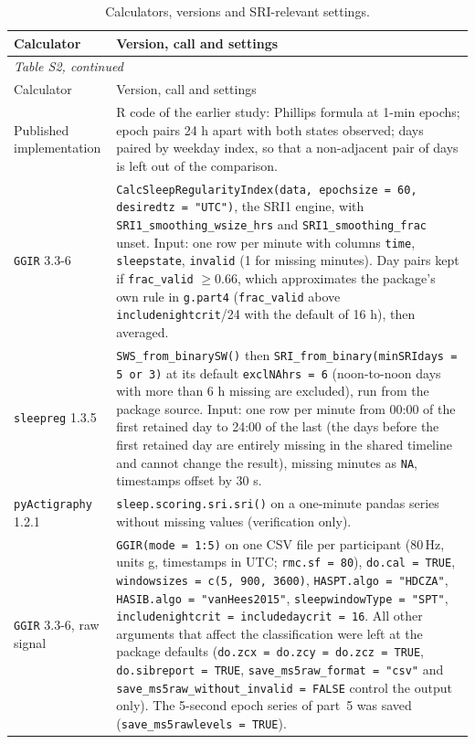 \documentclass[12pt]{article}
\begin{document}
{\small\setlength{\tabcolsep}{4pt}
\begin{longtable}{p{}>{\raggedright\arraybackslash}p{}}
\caption{Calculators, versions and SRI-relevant settings.}
\label{tab:S_versions}\\
\toprule
Calculator & Version, call and settings \\
\midrule
\endfirsthead
\multicolumn{2}{l}{\emph{Table S2, continued}}\\
\toprule
Calculator & Version, call and settings \\
\midrule
\endhead
\bottomrule
\endlastfoot
Published implementation & R code of the earlier study: Phillips formula at 1-min epochs; epoch pairs 24 h apart with both states observed; days paired by weekday index, so that a non-adjacent pair of days is left out of the comparison. \\
\texttt{GGIR} 3.3-6 & \texttt{CalcSleepRegularityIndex(data, epochsize = 60, desiredtz = "UTC")}, the SRI1 engine, with \texttt{SRI1\_smoothing\_wsize\_hrs} and \texttt{SRI1\_smoothing\_frac} unset. Input: one row per minute with columns \texttt{time}, \texttt{sleepstate}, \texttt{invalid} (1 for missing minutes). Day pairs kept if \texttt{frac\_valid} $\geq 0.66$, which approximates the package's own rule in \texttt{g.part4} (\texttt{frac\_valid} above \texttt{includenightcrit}/24 with the default of 16 h), then averaged. \\
\texttt{sleepreg} 1.3.5 & \texttt{SWS\_from\_binarySW()} then \texttt{SRI\_from\_binary(minSRIdays = 5 or 3)} at its default \texttt{exclNAhrs = 6} (noon-to-noon days with more than 6 h missing are excluded), run from the package source. Input: one row per minute from 00:00 of the first retained day to 24:00 of the last (the days before the first retained day are entirely missing in the shared timeline and cannot change the result), missing minutes as \texttt{NA}, timestamps offset by 30 s. \\
\texttt{pyActigraphy} 1.2.1 & \texttt{sleep.scoring.sri.sri()} on a one-minute pandas series without missing values (verification only). \\
\texttt{GGIR} 3.3-6, raw signal & \texttt{GGIR(mode = 1:5)} on one CSV file per participant (80\,Hz, units g, timestamps in UTC; \texttt{rmc.sf = 80}), \texttt{do.cal = TRUE}, \texttt{windowsizes = c(5, 900, 3600)}, \texttt{HASPT.algo = "HDCZA"}, \texttt{HASIB.algo = "vanHees2015"}, \texttt{sleepwindowType = "SPT"}, \texttt{includenightcrit = includedaycrit = 16}. All other arguments that affect the classification were left at the package defaults (\texttt{do.zcx = do.zcy = do.zcz = TRUE}, \texttt{do.sibreport = TRUE}, \texttt{save\_ms5raw\_format = "csv"} and \texttt{save\_ms5raw\_without\_invalid = FALSE} control the output only). The 5-second epoch series of part~5 was saved (\texttt{save\_ms5rawlevels = TRUE}). \\

\end{longtable}}
\end{document}
